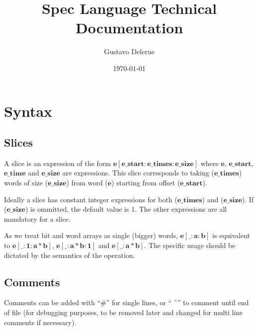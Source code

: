 \documentclass{article}
\title{Spec Language Technical Documentation}
\author{Gustavo Delerue}
\date{\today}
\begin{document}
  \maketitle
  \section{Syntax}
  \subsection{Slices}
  A slice is an expression of the form $\mathbf{e[e\_start:e\_times:e\_size]}$
  where $\mathbf{e}$, $\mathbf{e\_start}$, $\mathbf{e\_time}$ and
  $\mathbf{e\_size}$ are expressions.  This slice corresponds to taking
  ($\mathbf{e\_times}$) words of size ($\mathbf{e\_size}$) from word
  ($\mathbf{e}$) starting from offset ($\mathbf{e\_start}$).

  Ideally a slice has constant integer expressions for both
  ($\mathbf{e\_times}$) and ($\mathbf{e\_size}$).  If ($\mathbf{e\_size}$) is
  ommitted, the default value is 1. The other expressions are all mandatory for
  a slice.

  As we treat bit and word arrays as single (bigger) words, $\mathbf{e[\_:a:b]}$
  is equivalent to $\mathbf{e[\_:1:a*b]}$, $\mathbf{e[\_:a*b:1]}$ and
  $\mathbf{e[\_:a*b]}$. The specific usage should be dictated by the semantics
  of the operation.
  
  \subsection{Comments}
  Comments can be added with ``\#'' for single lines, or `` \^\ '' to comment
  until end of file (for debugging purposes, to be removed later and changed for
  multi line comments if necessary).
\end{document}
